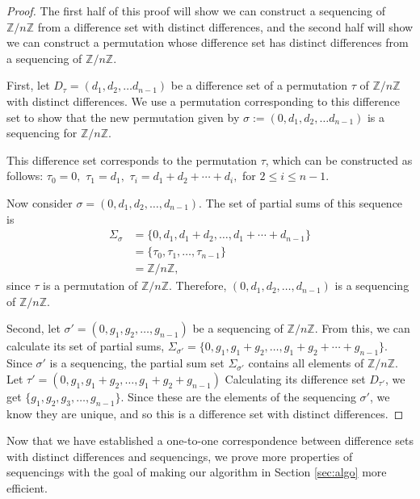 \documentclass[12pt]{article}
\theoremstyle{plain}
\theoremstyle{definition}
\theoremstyle{remark}
\newcommand{\ZZ}{\mathbb{Z}}
\newcommand{\differenceset}[1]{D_{#1}}
\newcommand{\partialsumset}[1]{\Sigma_{#1}}
\begin{document}
\begin{proof}
The first half of this proof will show we can construct a sequencing of $\ZZ/n\ZZ$ from a difference set with distinct differences, and the second half will show we can construct a permutation whose difference set has distinct differences from a sequencing of $\ZZ/n\ZZ$.
\par
First, let $\differenceset{\tau}=(d_1, d_2,\ldots d_{n-1})$ be a difference set of a permutation $\tau$ of $\ZZ/n\ZZ$ with distinct differences. We use a permutation corresponding to this difference set to show that the new permutation given by $\sigma := (0, d_1, d_2,\ldots d_{n-1})$ is a sequencing for $\ZZ/n\ZZ$.

This difference set corresponds to the permutation $\tau$, which can be constructed as follows:
$\tau_0 = 0,$
$\tau_1 = d_1,$
$\tau_i = d_1+d_2+\cdots + d_i,$ for  $2\leq i \leq n-1.$

Now consider $\sigma = (0, d_1, d_2,\ldots, d_{n-1})$. The set of partial sums of this sequence is 
\begin{align*}
\partialsumset{\sigma} &= \{0, d_1, d_1+d_2,\ldots,d_1+\cdots+ d_{n-1}\} \\
&= \{\tau_0,\tau_1,\ldots,\tau_{n-1}\}\\
&= \ZZ/n\ZZ,
\end{align*}
since $\tau$ is a permutation of $\ZZ/n\ZZ$. Therefore, $(0, d_1, d_2,\ldots, d_{n-1})$ is a sequencing of $\ZZ/n\ZZ$.

\par
Second, let $\sigma'=(0,g_1,g_2, \ldots, g_{n-1})$ be a sequencing of $\ZZ/n\ZZ$. From this, we can calculate its set of partial sums, $\partialsumset{\sigma'} = \{0, g_1, g_1+g_2, \ldots, g_1+g_2+\cdots+g_{n-1}\}$. Since $\sigma'$ is a sequencing, the partial sum set $\partialsumset{\sigma'}$ contains all elements of $\ZZ/n\ZZ$. Let $\tau' = (0, g_1, g_1+g_2, \ldots, g_1+g_2+g_{n-1})$ Calculating its difference set $D_{\tau'}$, we get $\{g_1, g_2, g_3, \ldots, g_{n-1}\}$. Since these are the elements of the sequencing $\sigma'$, we know they are unique, and so this is a difference set with distinct differences.

\end{proof}


Now that we have established a one-to-one correspondence between difference sets with distinct differences and sequencings, we prove more properties of sequencings with the goal of making our algorithm in Section \ref{sec:algo} more efficient.
\end{document}

